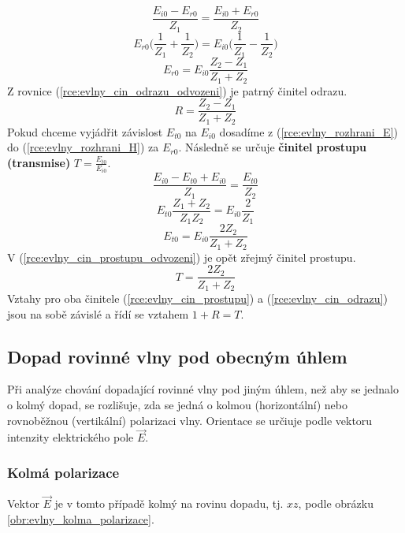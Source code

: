 \begin{displaymath}
	\frac{E_{i0}-E_{r0}}{Z_{1}} = \frac{E_{i0} + E_{r0}}{Z_{2}}
\end{displaymath}
\begin{displaymath}
	E_{r0}\Big( \frac{1}{Z_{1}} + \frac{1}{Z_{2}} \Big) = E_{i0}\Big( \frac{1}{Z_{1}} - \frac{1}{Z_{2}} \Big)
\end{displaymath}
\begin{equation}
	E_{r0} = E_{i0} \frac{Z_{2}-Z_{1}}{Z_{1}+Z_{2}}
	\label{rce:evlny_cin_odrazu_odvozeni}
\end{equation}
Z rovnice (\ref{rce:evlny_cin_odrazu_odvozeni}) je patrný činitel odrazu.
\begin{equation}
	R = \frac{Z_{2}-Z_{1}}{Z_{1}+Z_{2}}
	\label{rce:evlny_cin_odrazu}
\end{equation}
 Pokud chceme vyjádřit závislost $E_{t0}$ na $E_{i0}$ dosadíme z (\ref{rce:evlny_rozhrani_E}) do (\ref{rce:evlny_rozhrani_H}) za $E_{r0}$. Následně se určuje {\bf činitel prostupu (transmise)}  $T = \frac{E_{t0}}{E_{i0}}$. 
\begin{displaymath}
	\frac{E_{i0}-E_{t0}+E_{i0}}{Z_{1}} = \frac{E_{t0}}{Z_{2}}
\end{displaymath}
\begin{displaymath}
	E_{t0} \frac{Z_{1}+Z_{2}}{Z_{1}Z_{2}} = E_{i0} \frac{2}{Z_{1}}
\end{displaymath}
\begin{equation}
	E_{t0} = E_{i0} \frac{2Z_{2}}{Z_{1}+Z_{2}}
	\label{rce:evlny_cin_prostupu_odvozeni}
\end{equation}
V (\ref{rce:evlny_cin_prostupu_odvozeni}) je opět zřejmý činitel prostupu.
\begin{equation}
	T = \frac{2Z_{2}}{Z_{1}+Z_{2}}
	\label{rce:evlny_cin_prostupu}
\end{equation}
Vztahy pro oba činitele (\ref{rce:evlny_cin_prostupu}) a (\ref{rce:evlny_cin_odrazu}) jsou na sobě závislé a řídí se vztahem $1 + R = T$.

\subsection{Dopad rovinné vlny pod obecným úhlem}
Při analýze chování dopadající rovinné vlny pod jiným úhlem, než aby se jednalo o kolmý dopad, se rozlišuje, zda se jedná o kolmou (horizontální) nebo rovnoběžnou (vertikální) polarizaci vlny. Orientace se určiuje podle vektoru intenzity elektrického pole $\vec E$.
\subsubsection*{Kolmá polarizace}
Vektor $\vec E$ je v tomto případě kolmý na rovinu dopadu, tj. $xz$, podle obrázku \ref{obr:evlny_kolma_polarizace}.

